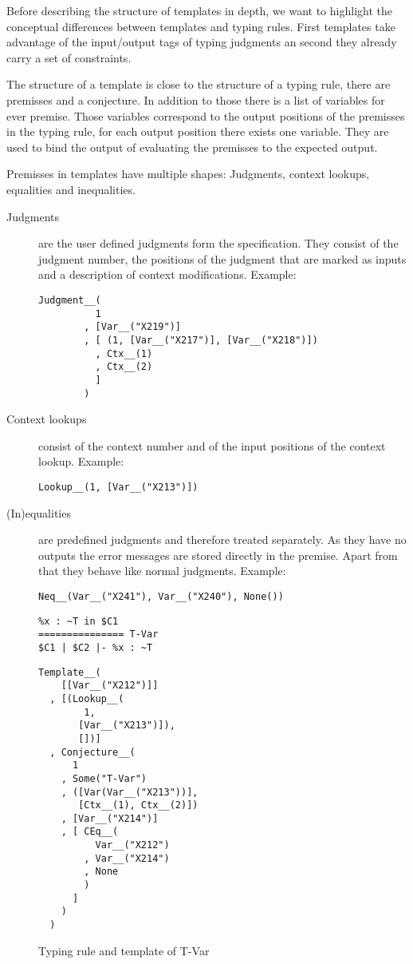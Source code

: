Before describing the structure of templates in depth, we want to
highlight the conceptual differences between templates and typing
rules. First templates take advantage of the input/output tags of
typing judgments an second they already carry a set of constraints.

The structure of a template is close to the structure of a typing
rule, there are premisses and a conjecture. In addition to those there
is a list of variables for ever premise. Those variables correspond to
the output positions of the premisses in the typing rule, for each
output position there exists one variable. They are used to bind the
output of evaluating the premisses to the expected output.

Premisses in templates have multiple shapes: Judgments, context
lookups, equalities and inequalities.

\begin{description}
\item[Judgments] are the user defined judgments form the
  specification. They consist of the judgment number, the positions of
  the judgment that are marked as inputs and a description of context
  modifications. Example:
\begin{verbatim}
Judgment__(
          1
        , [Var__("X219")]
        , [ (1, [Var__("X217")], [Var__("X218")])
          , Ctx__(1)
          , Ctx__(2)
          ]
        )
\end{verbatim}
\item[Context lookups] consist of the context number and of the input
  positions of the context lookup. Example:
\begin{verbatim}
Lookup__(1, [Var__("X213")])
\end{verbatim}
\item[(In)equalities] are predefined judgments and therefore treated
  separately. As they have no outputs the error messages are stored
  directly in the premise. Apart from that they behave like normal
  judgments. Example:
\begin{verbatim}
Neq__(Var__("X241"), Var__("X240"), None())
\end{verbatim}
\end{description}

\begin{figure}
  \centering
  \begin{minipage}{.45\linewidth}
\begin{verbatim}
%x : ~T in $C1
=============== T-Var
$C1 | $C2 |- %x : ~T
\end{verbatim}
  \end{minipage}
  \begin{minipage}{.45\linewidth}
\begin{verbatim}
Template__(
    [[Var__("X212")]]
  , [(Lookup__(
        1,
       [Var__("X213")]),
       [])]
  , Conjecture__(
      1
    , Some("T-Var")
    , ([Var(Var__("X213"))],
       [Ctx__(1), Ctx__(2)])
    , [Var__("X214")]
    , [ CEq__(
          Var__("X212")
        , Var__("X214")
        , None
        )
      ]
    )
  )
\end{verbatim}
  \end{minipage}
  \caption{Typing rule and template of T-Var}
  \label{fig:template-example}
\end{figure}
